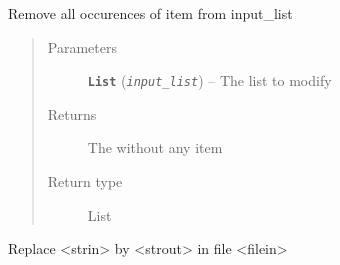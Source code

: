 \documentclass[a4paper,10pt,english]{sphinxmanual}
\begin{document}
\begin{fulllineitems}
\label{commands/apidoc/src:src.utilsSat.read_config_from_a_file}
\end{fulllineitems}


\begin{fulllineitems}
\label{commands/apidoc/src:src.utilsSat.red}
\end{fulllineitems}


\begin{fulllineitems}
\label{commands/apidoc/src:src.utilsSat.remove_item_from_list}
Remove all occurences of item from input\_list
\begin{quote}\begin{description}
\item[{Parameters}] \leavevmode
\textbf{\texttt{List}} (\emph{\texttt{input\_list}}) -- The list to modify

\item[{Returns}] \leavevmode
The without any item

\item[{Return type}] \leavevmode
List

\end{description}\end{quote}

\end{fulllineitems}


\begin{fulllineitems}
\label{commands/apidoc/src:src.utilsSat.replace_in_file}
Replace \textless{}strin\textgreater{} by \textless{}strout\textgreater{} in file \textless{}filein\textgreater{}

\end{fulllineitems}

\end{document}

